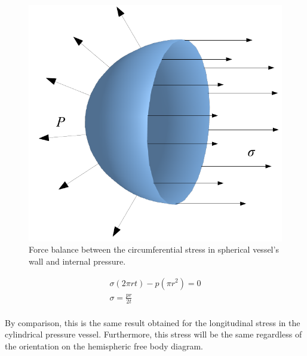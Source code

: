 \documentclass[
10pt,
a4paper,
openany,
svgnames,
]{book} %
\begin{document}
\begin{figure}[h]
  \centering
  \includegraphics[scale=0.6]{pictures/Combined-loadings/spherical-vessel}
  \caption{Force balance between the circumferential stress in spherical vessel's wall and internal pressure.}
  \label{fig: spherical vessel}
\end{figure}
\begin{equation}
  \begin{gathered}
    {\sigma }(2\pi rt) - p(\pi {r^2}) = 0 \\ 
    {\sigma } = \frac{{pr}}{{2t}} \\ 
  \end{gathered}
\end{equation}

By comparison, this is the same result obtained for the longitudinal stress in the cylindrical pressure vessel. Furthermore, this stress will be the same regardless of the orientation on the hemispheric free body diagram.
\end{document}
